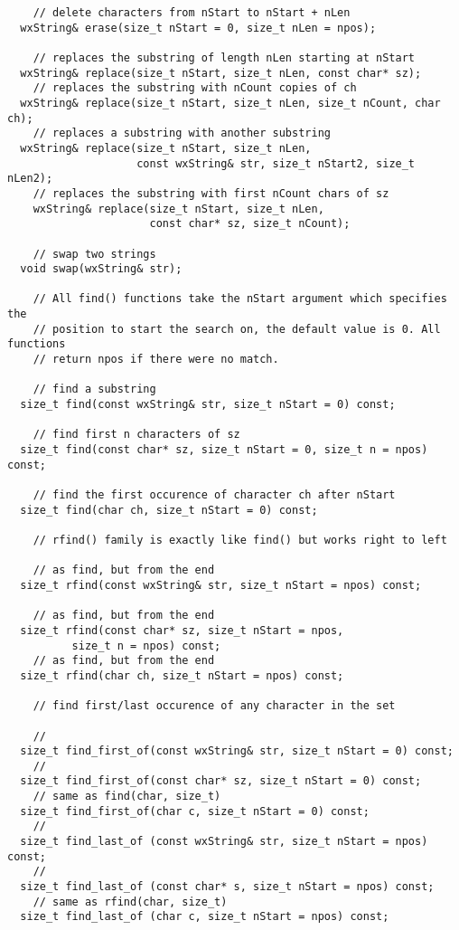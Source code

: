 {\begin{verbatim}
    // delete characters from nStart to nStart + nLen
  wxString& erase(size_t nStart = 0, size_t nLen = npos);

    // replaces the substring of length nLen starting at nStart
  wxString& replace(size_t nStart, size_t nLen, const char* sz);
    // replaces the substring with nCount copies of ch
  wxString& replace(size_t nStart, size_t nLen, size_t nCount, char ch);
    // replaces a substring with another substring
  wxString& replace(size_t nStart, size_t nLen,
                    const wxString& str, size_t nStart2, size_t nLen2);
    // replaces the substring with first nCount chars of sz
    wxString& replace(size_t nStart, size_t nLen,
                      const char* sz, size_t nCount);

    // swap two strings
  void swap(wxString& str);

    // All find() functions take the nStart argument which specifies the
    // position to start the search on, the default value is 0. All functions
    // return npos if there were no match.

    // find a substring
  size_t find(const wxString& str, size_t nStart = 0) const;

    // find first n characters of sz
  size_t find(const char* sz, size_t nStart = 0, size_t n = npos) const;

    // find the first occurence of character ch after nStart
  size_t find(char ch, size_t nStart = 0) const;

    // rfind() family is exactly like find() but works right to left

    // as find, but from the end
  size_t rfind(const wxString& str, size_t nStart = npos) const;

    // as find, but from the end
  size_t rfind(const char* sz, size_t nStart = npos,
          size_t n = npos) const;
    // as find, but from the end
  size_t rfind(char ch, size_t nStart = npos) const;

    // find first/last occurence of any character in the set

    //
  size_t find_first_of(const wxString& str, size_t nStart = 0) const;
    //
  size_t find_first_of(const char* sz, size_t nStart = 0) const;
    // same as find(char, size_t)
  size_t find_first_of(char c, size_t nStart = 0) const;
    //
  size_t find_last_of (const wxString& str, size_t nStart = npos) const;
    //
  size_t find_last_of (const char* s, size_t nStart = npos) const;
    // same as rfind(char, size_t)
  size_t find_last_of (char c, size_t nStart = npos) const;


\end{verbatim}}
